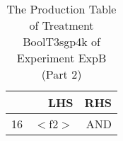 \begin{table}[ht]
\centering
\begin{tabular}{rrr}
  \hline
 & LHS & RHS \\ 
  \hline
16 & $<$f2$>$ & AND \\ 
   \hline
\end{tabular}
\caption{The Production Table of Treatment BoolT3sgp4k of Experiment ExpB (Part 2)} 
\end{table}
